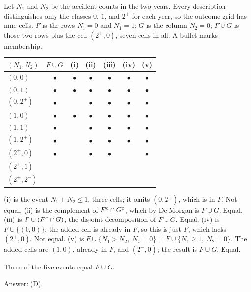 \begin{solution}
Let $N_1$ and $N_2$ be the accident counts in the two years. Every description
distinguishes only the classes $0$, $1$, and $2^{+}$ for each year, so the outcome
grid has nine cells. $F$ is the rows $N_1 = 0$ and $N_1 = 1$; $G$ is the column
$N_2 = 0$; $F \cup G$ is those two rows plus the cell $(2^{+}, 0)$, seven cells in all.
A bullet marks membership.
\begin{center}
\begin{tabular}{@{}lcccccc@{}}
\toprule
$(N_1, N_2)$ & $F \cup G$ & (i) & (ii) & (iii) & (iv) & (v) \\
\midrule
$(0,0)$          & $\bullet$ & $\bullet$ & $\bullet$ & $\bullet$ & $\bullet$ & $\bullet$ \\
$(0,1)$          & $\bullet$ & $\bullet$ & $\bullet$ & $\bullet$ & $\bullet$ & $\bullet$ \\
$(0,2^{+})$      & $\bullet$ &           & $\bullet$ & $\bullet$ & $\bullet$ & $\bullet$ \\
$(1,0)$          & $\bullet$ & $\bullet$ & $\bullet$ & $\bullet$ & $\bullet$ & $\bullet$ \\
$(1,1)$          & $\bullet$ &           & $\bullet$ & $\bullet$ & $\bullet$ & $\bullet$ \\
$(1,2^{+})$      & $\bullet$ &           & $\bullet$ & $\bullet$ & $\bullet$ & $\bullet$ \\
$(2^{+},0)$      & $\bullet$ &           & $\bullet$ & $\bullet$ &           & $\bullet$ \\
$(2^{+},1)$      &           &           &           &           &           &           \\
$(2^{+},2^{+})$  &           &           &           &           &           &           \\
\bottomrule
\end{tabular}
\end{center}
(i) is the event $N_1 + N_2 \le 1$, three cells; it omits $(0, 2^{+})$, which is in
$F$. Not equal.
(ii) is the complement of $F^{\mathrm{c}} \cap G^{\mathrm{c}}$, which by De Morgan is $F \cup G$. Equal.
(iii) is $F \cup (F^{\mathrm{c}} \cap G)$, the disjoint decomposition of $F \cup G$. Equal.
(iv) is $F \cup \{(0,0)\}$; the added cell is already in $F$, so this is just $F$,
which lacks $(2^{+}, 0)$. Not equal.
(v) is $F \cup \{N_1 > N_2,\ N_2 = 0\} = F \cup \{N_1 \ge 1,\ N_2 = 0\}$. The added
cells are $(1,0)$, already in $F$, and $(2^{+},0)$; the result is $F \cup G$. Equal.

Three of the five events equal $F \cup G$.

Answer: (D).
\end{solution}

